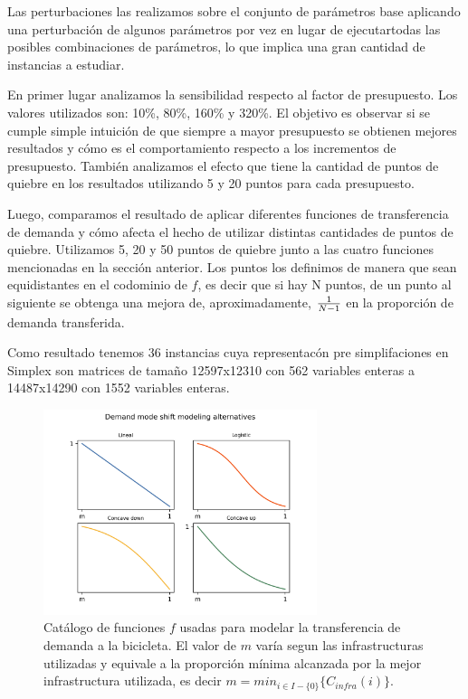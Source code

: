\documentclass{article}
\begin{document}
  Las perturbaciones las realizamos sobre el conjunto de parámetros base aplicando una perturbación de algunos parámetros por vez en lugar de ejecutartodas las posibles combinaciones de parámetros, lo que implica una gran cantidad de instancias a estudiar.

  En primer lugar analizamos la sensibilidad respecto al factor de presupuesto. Los valores utilizados son: 10\%, 80\%, 160\% y 320\%. El objetivo es observar si se cumple simple intuición de que siempre a mayor presupuesto se obtienen mejores resultados y cómo es el comportamiento respecto a los incrementos de presupuesto. También analizamos el efecto que tiene la cantidad de puntos de quiebre en los resultados utilizando 5 y 20 puntos para cada presupuesto.

  Luego, comparamos el resultado de aplicar diferentes funciones de transferencia de demanda y cómo afecta el hecho de utilizar distintas cantidades de puntos de quiebre. Utilizamos 5, 20 y 50 puntos de quiebre junto a las cuatro funciones mencionadas en la sección anterior. Los puntos los definimos de manera que sean equidistantes en el codominio de $f$, es decir que si hay N puntos, de un punto al siguiente se obtenga una mejora de, aproximadamente, ${1 \over N - 1}$ en la proporción de demanda transferida.

  Como resultado tenemos 36 instancias cuya representacón pre simplifaciones en Simplex son matrices de tamaño 12597x12310 con 562 variables enteras a 14487x14290 con 1552 variables enteras.

  \begin{figure}[h!]
    \centering
    \includegraphics[width=8cm]{../resources/f_catalog.png}
      \caption{Catálogo de funciones $f$ usadas para modelar la transferencia de demanda a la bicicleta. El valor de $m$ varía segun las infrastructuras utilizadas y equivale a la proporción mínima alcanzada por la mejor infrastructura utilizada, es decir $m = min_{i \in I - \{0\}} \{ C_{infra}(i) \}$.}
    \label{fig:fcatalog}
  \end{figure}
\end{document}
